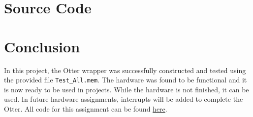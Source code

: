 \documentclass[
    a4paper, %
	12pt, %
    ]{CSSullivanBusinessReport}
\begin{document}
\begin{fullwidth}
\section{Source Code}
\captionsetup{style=widetable}


\newpage




% 




\section{Conclusion} %
\hypersetup{urlcolor=blue} 
In this project, the Otter wrapper was successfully constructed and tested using the provided file \verb|Test_All.mem|. The hardware was found to be functional and it is now ready to be used in projects. While the hardware is not finished, it can be used. In future hardware assignments, interrupts will be added to complete the Otter. 
All code for this assignment can be found \href{https://github.com/EthanV1920/CPE-233-Otter/tree/main}{here}.


\end{fullwidth}
\end{document}

